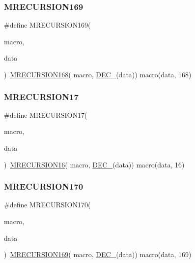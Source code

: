 \subsubsection{\texorpdfstring{MRECURSION169}{MRECURSION169}}
{\footnotesize\ttfamily \#define M\+R\+E\+C\+U\+R\+S\+I\+O\+N169(\begin{DoxyParamCaption}\item[{}]{macro,  }\item[{}]{data }\end{DoxyParamCaption})~\mbox{\hyperlink{group__group__sam0__utils__mrecursion_gadaf1ee758a9df8e9fc64e904b34ba008}{M\+R\+E\+C\+U\+R\+S\+I\+O\+N168}}(  macro, \mbox{\hyperlink{group__group__sam0__utils__mrecursion_ga1d23d683797679dca8c3512a54a5dcae}{D\+E\+C\+\_\+}}(data))   macro(data, 168)}

\mbox{\label{group__group__sam0__utils__mrecursion_gad2d391ce496952ee9fda6f54753643f9}} 
\subsubsection{\texorpdfstring{MRECURSION17}{MRECURSION17}}
{\footnotesize\ttfamily \#define M\+R\+E\+C\+U\+R\+S\+I\+O\+N17(\begin{DoxyParamCaption}\item[{}]{macro,  }\item[{}]{data }\end{DoxyParamCaption})~\mbox{\hyperlink{group__group__sam0__utils__mrecursion_ga0a04774b719e39b0dc77ef3fd9013110}{M\+R\+E\+C\+U\+R\+S\+I\+O\+N16}}(  macro, \mbox{\hyperlink{group__group__sam0__utils__mrecursion_ga1d23d683797679dca8c3512a54a5dcae}{D\+E\+C\+\_\+}}(data))   macro(data, 16)}

\mbox{\label{group__group__sam0__utils__mrecursion_gaa0c6ffd6bc8a340f3acbbb7f8ec44e2e}} 
\subsubsection{\texorpdfstring{MRECURSION170}{MRECURSION170}}
{\footnotesize\ttfamily \#define M\+R\+E\+C\+U\+R\+S\+I\+O\+N170(\begin{DoxyParamCaption}\item[{}]{macro,  }\item[{}]{data }\end{DoxyParamCaption})~\mbox{\hyperlink{group__group__sam0__utils__mrecursion_gaca0a21c7432f21cb2659932191c15b95}{M\+R\+E\+C\+U\+R\+S\+I\+O\+N169}}(  macro, \mbox{\hyperlink{group__group__sam0__utils__mrecursion_ga1d23d683797679dca8c3512a54a5dcae}{D\+E\+C\+\_\+}}(data))   macro(data, 169)}

